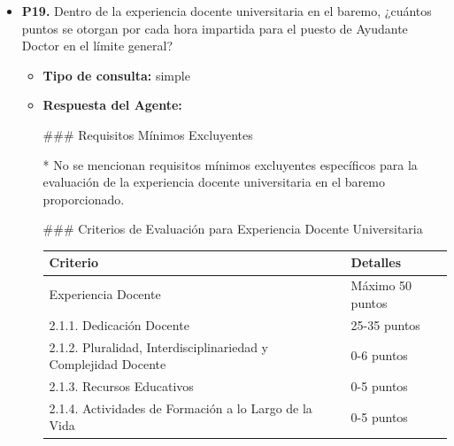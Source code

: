 \documentclass{article}
\begin{document}
\begin{itemize}
\begin{itemize}
            \end{itemize}

      \item \textbf{P19.} Dentro de la experiencia docente universitaria en el baremo, ¿cuántos puntos se otorgan por cada hora impartida para el puesto de Ayudante Doctor en el límite general? \\
            \begin{itemize}
                  \item \textbf{Tipo de consulta:} simple
                  \item \textbf{Respuesta del Agente:}

                        \#\#\# Requisitos Mínimos Excluyentes

                        * No se mencionan requisitos mínimos excluyentes específicos para la evaluación de la experiencia docente universitaria en el baremo proporcionado.

                        \#\#\# Criterios de Evaluación para Experiencia Docente Universitaria

                        \vspace{0.4cm}
                        \begin{table}[h!]\centering\renewcommand{\arraystretch}{1.3}
                              \begin{tabular}{|p{}|p{}|}\hline
                                    Criterio                                                       & Detalles         \\\hline
                                    Experiencia Docente                                            & Máximo 50 puntos \\\hline
                                    2.1.1. Dedicación Docente                                      & 25-35 puntos     \\\hline
                                    2.1.2. Pluralidad, Interdisciplinariedad y Complejidad Docente & 0-6 puntos       \\\hline
                                    2.1.3. Recursos Educativos                                     & 0-5 puntos       \\\hline
                                    2.1.4. Actividades de Formación a lo Largo de la Vida          & 0-5 puntos       \\\hline
                              \end{tabular}\end{table}
                        \vspace{0.4cm}


\end{itemize}
\end{itemize}
\end{document}
